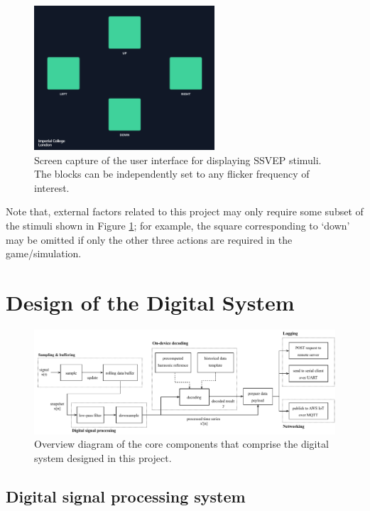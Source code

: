 \begin{figure}[!htb]
    \centering
    \includegraphics[width=0.6\textwidth]{ssvep-squares}
    \caption{Screen capture of the user interface for displaying SSVEP stimuli. The blocks can be independently set to any flicker frequency of interest.}
    \label{fig:ssvep-squares-c5}
\end{figure}

Note that, external factors related to this project may only require some subset of the stimuli shown in Figure \ref{fig:ssvep-squares-c5}; for example, the square corresponding to `down' may be omitted if only the other three actions are required in the game/simulation. 

\section{Design of the Digital System}
\begin{figure}[!htb]
    \centering
    \includegraphics[width=\textwidth]{digital-system-overview}
    \caption{Overview diagram of the core components that comprise the digital system designed in this project.}
    \label{fig:digital-system-overview-c5}
\end{figure}


\subsection{Digital signal processing system}

